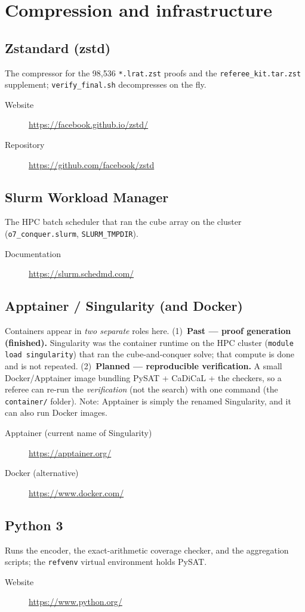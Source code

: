 \documentclass[11pt]{article}
\newcommand{\tool}[1]{\subsection{#1}}
\begin{document}
\section{Compression and infrastructure}

\tool{Zstandard (zstd)}
The compressor for the 98{,}536 \texttt{*.lrat.zst} proofs and the
\texttt{referee\_kit.tar.zst} supplement; \texttt{verify\_final.sh} decompresses
on the fly.
\begin{description}
  \item[Website] \url{https://facebook.github.io/zstd/}
  \item[Repository] \url{https://github.com/facebook/zstd}
\end{description}

\tool{Slurm Workload Manager}
The HPC batch scheduler that ran the cube array on the cluster
(\texttt{o7\_conquer.slurm}, \texttt{SLURM\_TMPDIR}).
\begin{description}
  \item[Documentation] \url{https://slurm.schedmd.com/}
\end{description}

\tool{Apptainer / Singularity (and Docker)}
Containers appear in \emph{two separate} roles here. (1)~\textbf{Past --- proof
generation (finished).} Singularity was the container runtime on the HPC cluster
(\texttt{module load singularity}) that ran the cube-and-conquer solve; that
compute is done and is not repeated. (2)~\textbf{Planned --- reproducible
verification.} A small Docker/Apptainer image bundling PySAT + CaDiCaL + the
checkers, so a referee can re-run the \emph{verification} (not the search) with
one command (the \texttt{container/} folder). Note: Apptainer is simply the
renamed Singularity, and it can also run Docker images.
\begin{description}
  \item[Apptainer (current name of Singularity)] \url{https://apptainer.org/}
  \item[Docker (alternative)] \url{https://www.docker.com/}
\end{description}

\tool{Python 3}
Runs the encoder, the exact-arithmetic coverage checker, and the aggregation
scripts; the \texttt{refvenv} virtual environment holds PySAT.
\begin{description}
  \item[Website] \url{https://www.python.org/}
\end{description}
\end{document}
